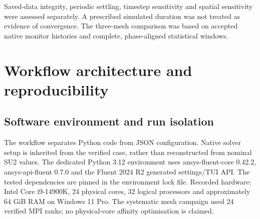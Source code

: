 \documentclass[11pt,a4paper]{article}
\begin{document}
Saved-data integrity, periodic settling, timestep sensitivity and spatial sensitivity were assessed separately. A prescribed simulated duration was not treated as evidence of convergence. The three-mesh comparison was based on accepted native monitor histories and complete, phase-aligned statistical windows.\par

\FloatBarrier
\section{Workflow architecture and reproducibility}
\subsection{Software environment and run isolation}
The workflow separates Python code from JSON configuration. Native solver setup is inherited from the verified case, rather than reconstructed from nominal SU2 values. The dedicated Python 3.12 environment uses ansys-fluent-core 0.42.2, ansys-api-fluent 0.7.0 and the Fluent 2024 R2 generated settings/TUI API. The tested dependencies are pinned in the environment lock file. Recorded hardware: Intel Core i9-14900K, 24 physical cores, 32 logical processors and approximately 64 GiB RAM on Windows 11 Pro. The systematic mesh campaign used 24 verified MPI ranks; no physical-core affinity optimisation is claimed.\par
\end{document}
